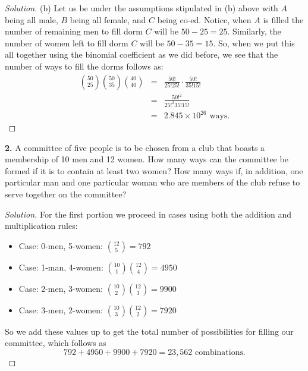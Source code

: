\documentclass[12pt]{amsart}
\newenvironment{solution}
{\begin{proof}[Solution]}
{\end{proof}}
\begin{document}
\begin{onehalfspace}
\begin{solution}
            (b) Let us be under the assumptions stipulated in (b) above with $A$ being all male, $B$ being all female,
            and $C$ being co-ed. Notice, when $A$ is filled the number of remaining men to fill dorm $C$ will be
            $50 - 25 = 25$. Similarly, the number of women left to fill dorm $C$ will be $50 - 35 = 15$. So, when we
            put this all together using the binomial coefficient as we did before, we see that the number of ways to fill
            the dorms follows as:
            \begin{eqnarray*}
                \binom{50}{25}\binom{50}{35}\binom{40}{40} & = & \frac{50!}{25!25!}\cdot\frac{50!}{35!15!} \\
                                                           & = & \frac{50!^2}{25!^2 35!15!} \\
                                                           & = & 2.845 \times 10^{26} \text{ ways.}
            \end{eqnarray*}
        \end{solution}

        \textbf{2.} A committee of five people is to be chosen from a club that boasts a
        membership of 10 men and 12 women. How many ways can the committee be formed if
        it is to contain at least two women? How many ways if, in addition, one
        particular man and one particular woman who are members of the club refuse to
        serve together on the committee?
        \begin{solution}
            For the first portion we proceed in cases using both the addition and multiplication rules:
            \begin{itemize}
                \item Case: 0-men, 5-women: $\binom{12}{5} = 792$
                \item Case: 1-man, 4-women: $\binom{10}{1}\binom{12}{4} = 4950$
                \item Case: 2-men, 3-women: $\binom{10}{2}\binom{12}{3} = 9900$
                \item Case: 3-men, 2-women: $\binom{10}{3}\binom{12}{2} = 7920$
            \end{itemize}
            So we add these values up to get the total number of possibilities for filling our committee, which follows
            as
            \begin{displaymath}
                792 + 4950 + 9900 + 7920 = 23,562 \text{ combinations.}
            \end{displaymath}


\end{solution}
\end{onehalfspace}
\end{document}
